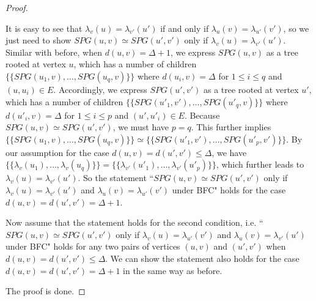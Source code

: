 \begin{proof}
\begin{itemize}
    It is easy to see that $\lambda_v(u)= \lambda_{v'}(u')$ if and only if $\lambda_u(v)= \lambda_{u'}(v')$, so we just need to show $SPG(u,v)\simeq SPG(u',v')$ only if $\lambda_v(u) = \lambda_{v'}(u')$. 
    Similar with before, when $d(u,v)=\Delta+1$, we express $SPG(u,v)$ as a tree rooted at vertex $u$, which has a number of children $\{\!\!\{SPG(u_1,v),\dots, SPG(u_q,v)\}\!\!\}$ where $d(u_i,v)=\Delta$ for $1\leq i\leq q$ and $(u,u_i)\in E$. Accordingly, we express $SPG(u',v')$ as a tree rooted at vertex $u'$, which has a number of children $\{\!\!\{SPG(u'_1,v'),\dots, SPG(u'_q,v)\}\!\!\}$ where $d(u'_i,v)=\Delta$ for $1\leq i\leq p$ and $(u',u'_i)\in E$.    
    Because $SPG(u,v)\simeq SPG(u',v')$, we must have $p=q$. This further implies $\{\!\!\{SPG(u_1,v),\dots, SPG(u_q,v)\}\!\!\}\simeq \{\!\!\{SPG(u'_1,v'),\dots, SPG(u'_p,v')\}\!\!\}$. By our assumption for the case $d(u,v)=d(u',v')\leq \Delta$, we have $\{\!\!\{\lambda_v(u_1),\dots, \lambda_v(u_q)\}\!\!\}= \{\!\!\{\lambda_{v'}(u'_1),\dots, \lambda_{v'}(u'_p)\}\!\!\}$, which further leads to $\lambda_v(u) = \lambda_{v'}(u')$. So the statement ``$SPG(u,v)\simeq SPG(u',v')$ only if $\lambda_v(u)= \lambda_{v'}(u')$ and $\lambda_u(v)= \lambda_{u'}(v')$ under BFC" holds  for the case $d(u,v)=d(u',v')= \Delta+1$.

    Now assume that the statement holds for the second condition, i.e. ``$SPG(u,v)\simeq SPG(u',v')$ only if $\lambda_v(u)= \lambda_{u'}(v')$ and $\lambda_u(v)= \lambda_{v'}(u')$ under BFC" holds for any two pairs of vertices $(u,v)$ and $(u',v')$ when $d(u,v)=d(u',v')\leq \Delta$. We can show the statement also holds  for the case $d(u,v)=d(u',v')= \Delta+1$ in the same way as before.
\end{itemize}
The proof is done.
\end{proof}

\lvcbfsesgp*

